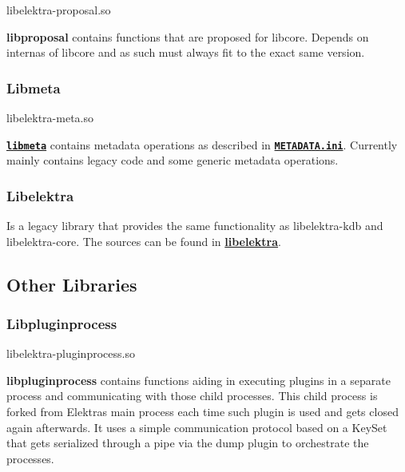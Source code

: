 \begin{DoxyVerb}libelektra-proposal.so
\end{DoxyVerb}


{\bfseries libproposal} contains functions that are proposed for libcore. Depends on internas of libcore and as such must always fit to the exact same version.

\subsubsection*{Libmeta}

\begin{DoxyVerb}libelektra-meta.so
\end{DoxyVerb}


{\bfseries \href{/home/markus/Projekte/Elektra/current/src/libs/meta/meta.c}{\tt libmeta}} contains metadata operations as described in {\bfseries \href{/home/markus/Projekte/Elektra/current/doc/METADATA.ini}{\tt M\+E\+T\+A\+D\+A\+T\+A.\+ini}}. Currently mainly contains legacy code and some generic metadata operations.

\subsubsection*{Libelektra}

Is a legacy library that provides the same functionality as {\ttfamily libelektra-\/kdb} and {\ttfamily libelektra-\/core}. The sources can be found in {\bfseries \hyperlink{md_src_libs_elektra_README_src_libs_elektra_README_md}{libelektra}}.

\subsection*{Other Libraries}

\subsubsection*{Libpluginprocess}

\begin{DoxyVerb}libelektra-pluginprocess.so
\end{DoxyVerb}


{\bfseries libpluginprocess} contains functions aiding in executing plugins in a separate process and communicating with those child processes. This child process is forked from Elektra\textquotesingle{}s main process each time such plugin is used and gets closed again afterwards. It uses a simple communication protocol based on a Key\+Set that gets serialized through a pipe via the dump plugin to orchestrate the processes.

